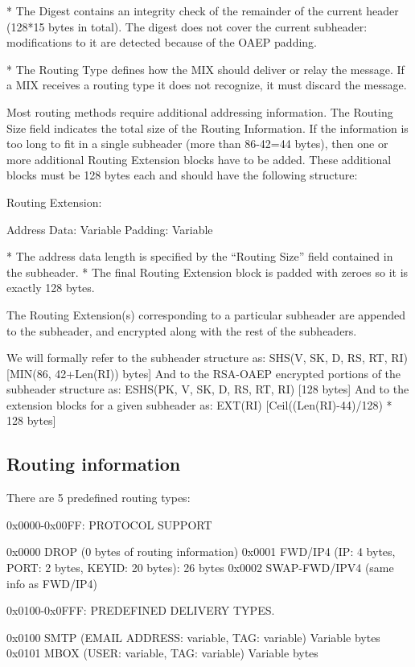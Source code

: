 * The Digest contains an integrity check of the remainder of the current
header (128*15 bytes in total). The digest does not cover the current
subheader: modifications to it are detected because of the OAEP padding.

* The Routing Type defines how the MIX should deliver or relay the
  message. If a MIX receives a routing type it does not recognize,
  it must discard the message.

  Most routing methods require additional addressing information.
  The Routing Size field indicates the total size of the Routing
  Information. If the information is too long to fit in a single
  subheader (more than 86-42=44 bytes), then one or more additional
  Routing Extension blocks have to be added. These additional blocks
  must be 128 bytes each and should have the following structure:
 
  Routing Extension:

    Address Data:     Variable
    Padding:          Variable

* The address data length is specified by the ``Routing Size'' field
  contained in the subheader.
* The final Routing Extension block is padded with zeroes so it is
  exactly 128 bytes.

The Routing Extension(s) corresponding to a particular subheader are
appended to the subheader, and encrypted along with the rest of the
subheaders.

We will formally refer to the subheader structure as:
SHS(V, SK, D, RS, RT, RI)     [MIN(86, 42+Len(RI)) bytes] 
And to the RSA-OAEP encrypted portions of the subheader structure as:
ESHS(PK, V, SK, D, RS, RT, RI)   [128 bytes]
And to the extension blocks for a given subheader as:
EXT(RI)                       [Ceil((Len(RI)-44)/128) * 128 bytes]

\subsection{Routing information}

There are 5 predefined routing types:

0x0000-0x00FF: PROTOCOL SUPPORT

0x0000 DROP    (0 bytes of routing information)
0x0001 FWD/IP4 (IP: 4 bytes, PORT: 2 bytes, KEYID: 20 bytes): 26 bytes
0x0002 SWAP-FWD/IPV4 (same info as FWD/IP4)

0x0100-0x0FFF: PREDEFINED DELIVERY TYPES.

0x0100 SMTP   (EMAIL ADDRESS: variable, TAG: variable) Variable bytes
0x0101 MBOX   (USER: variable, TAG: variable) Variable bytes


